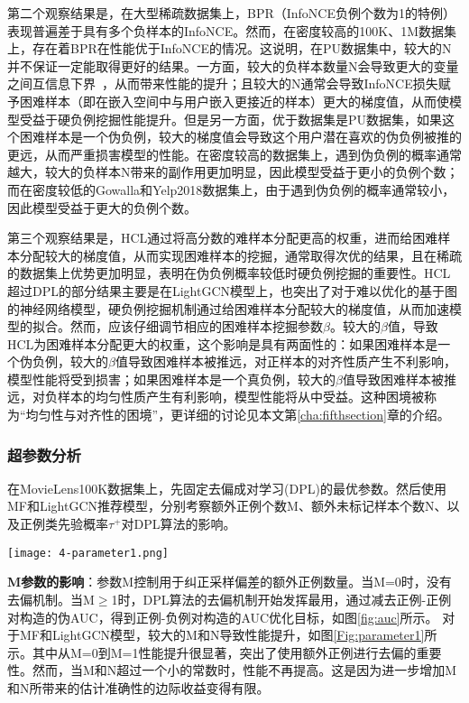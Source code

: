 第二个观察结果是，在大型稀疏数据集上，BPR（InfoNCE负例个数为1的特例）表现普遍差于具有多个负样本的InfoNCE。然而，在密度较高的100K、1M数据集上，存在着BPR在性能优于InfoNCE的情况。这说明，在PU数据集中，较大的N并不保证一定能取得更好的结果。一方面，较大的负样本数量N会导致更大的变量之间互信息下界~\cite{Oord:2018:arxiv}，从而带来性能的提升；且较大的N通常会导致InfoNCE损失赋予困难样本（即在嵌入空间中与用户嵌入更接近的样本）更大的梯度值\cite{Jiancan:2022:arxiv}，从而使模型受益于硬负例挖掘性能提升。但是另一方面，优于数据集是PU数据集，如果这个困难样本是一个伪负例，较大的梯度值会导致这个用户潜在喜欢的伪负例被推的更远，从而严重损害模型的性能。在密度较高的数据集上，遇到伪负例的概率通常越大，较大的负样本N带来的副作用更加明显，因此模型受益于更小的负例个数；而在密度较低的Gowalla和Yelp2018数据集上，由于遇到伪负例的概率通常较小，因此模型受益于更大的负例个数。

第三个观察结果是，HCL通过将高分数的难样本分配更高的权重，进而给困难样本分配较大的梯度值，从而实现困难样本的挖掘，通常取得次优的结果，且在稀疏的数据集上优势更加明显，表明在伪负例概率较低时硬负例挖掘的重要性。HCL超过DPL的部分结果主要是在LightGCN模型上，也突出了对于难以优化的基于图的神经网络模型，硬负例挖掘机制通过给困难样本分配较大的梯度值，从而加速模型的拟合。然而，应该仔细调节相应的困难样本挖掘参数$\beta$。较大的$\beta$值，导致HCL为困难样本分配更大的权重，这个影响是具有两面性的：如果困难样本是一个伪负例，较大的$\beta$值导致困难样本被推远，对正样本的对齐性质产生不利影响，模型性能将受到损害；如果困难样本是一个真负例，较大的$\beta$值导致困难样本被推远，对负样本的均匀性质产生有利影响，模型性能将从中受益。这种困境被称为“均匀性与对齐性的困境”\cite{Feng:2021:CVPR}，更详细的讨论见本文第\ref{cha:fifthsection}章的介绍。


\subsubsection{超参数分析}
在MovieLens100K数据集上，先固定去偏成对学习(DPL)的最优参数。然后使用MF和LightGCN推荐模型，分别考察额外正例个数M、额外未标记样本个数N、以及正例类先验概率$\tau^+$对DPL算法的影响。
\begin{figure*}[h!]
	\centering
	\texttt{[image: 4-parameter1.png]}
	\caption{超参数M的影响}
	\label{Fig:parameter1}
\end{figure*}

\textbf{M参数的影响}：参数M控制用于纠正采样偏差的额外正例数量。当M=0时，没有去偏机制。当M$\geq$1时，DPL算法的去偏机制开始发挥最用，通过减去正例-正例对构造的伪AUC，得到正例-负例对构造的AUC优化目标，如图\ref{fig:auc}所示。
对于MF和LightGCN模型，较大的M和N导致性能提升，如图\ref{Fig:parameter1}所示。其中从M=0到M=1性能提升很显著，突出了使用额外正例进行去偏的重要性。然而，当M和N超过一个小的常数时，性能不再提高。这是因为进一步增加M和N所带来的估计准确性的边际收益变得有限。


